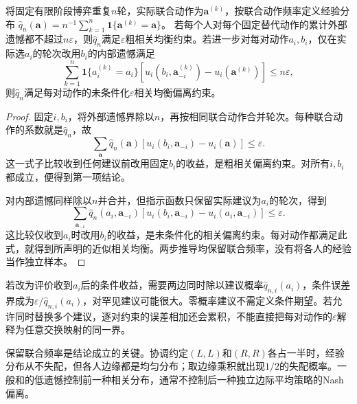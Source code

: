 \begin{theorem}[阶段遗憾与联合经验分布]
\label{thm:rl-multi-agent-regret-ce}
将固定有限阶段博弈重复$n$轮，实际联合动作为$\bm a^{(k)}$，按联合动作频率定义经验分布
$\hat q_n(\bm a)=n^{-1}\sum_{k=1}^n\mathbf1\{\bm a^{(k)}=\bm a\}$。
若每个人对每个固定替代动作的累计外部遗憾都不超过$n\varepsilon$，则$\hat q_n$满足$\varepsilon$粗相关均衡约束。若进一步对每对动作$a_i,b_i$，仅在实际选$a_i$的轮次改用$b_i$的内部遗憾满足
\[
 \sum_{k=1}^n\mathbf1\{a_i^{(k)}=a_i\}
 [u_i(b_i,\bm a_{-i}^{(k)})-u_i(\bm a^{(k)})]
 \leq n\varepsilon,
\]
则$\hat q_n$满足每对动作的未条件化$\varepsilon$相关均衡偏离约束。
\end{theorem}
\begin{proof}
固定$i,b_i$，将外部遗憾界除以$n$，再按相同联合动作合并轮次。每种联合动作的系数就是$\hat q_n$，故
\[
 \sum_{\bm a}\hat q_n(\bm a)
 [u_i(b_i,\bm a_{-i})-u_i(\bm a)]\leq\varepsilon.
\]
这一式子比较收到任何建议前改用固定$b_i$的收益，是粗相关偏离约束。对所有$i,b_i$都成立，便得到第一项结论。

对内部遗憾同样除以$n$并合并，但指示函数只保留实际建议为$a_i$的轮次，得到
\[
 \sum_{\bm a_{-i}}\hat q_n(a_i,\bm a_{-i})
 [u_i(b_i,\bm a_{-i})-u_i(a_i,\bm a_{-i})]\leq\varepsilon.
\]
这比较仅收到$a_i$时改用$b_i$的收益，是未条件化的相关偏离约束。每对动作都满足此式，就得到所声明的近似相关均衡。两步推导均保留联合频率，没有将各人的经验当作独立样本。
\end{proof}

若改为评价收到$a_i$后的条件收益，需要两边同时除以建议概率$\hat q_{n,i}(a_i)$，条件误差界成为$\varepsilon/\hat q_{n,i}(a_i)$，对罕见建议可能很大。零概率建议不需定义条件期望。若允许同时替换多个建议，逐对约束的误差相加还会累积，不能直接把每对动作的$\varepsilon$解释为任意交换映射的同一界。

保留联合频率是结论成立的关键。协调约定$(L,L)$和$(R,R)$各占一半时，经验分布从不失配，但各人边缘都是均匀分布；取边缘乘积就出现$1/2$的失配概率。一般和的低遗憾控制前一种相关分布，通常不控制后一种独立边际平均策略的Nash偏离。

